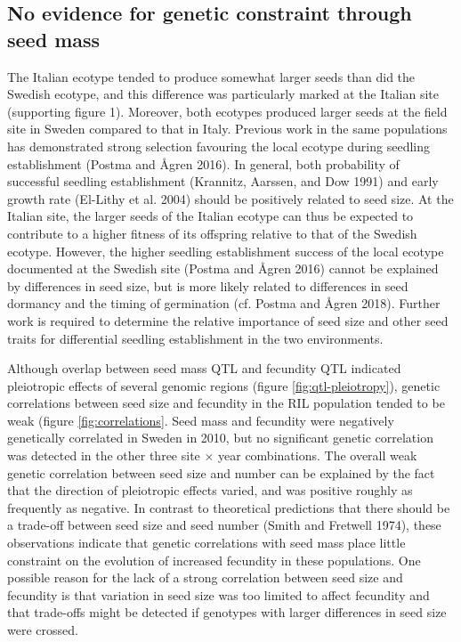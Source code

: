 \documentclass[]{article}
\begin{document}
\hypertarget{no-evidence-for-genetic-constraint-through-seed-mass}{%
\subsection{No evidence for genetic constraint through seed mass}\label{no-evidence-for-genetic-constraint-through-seed-mass}}

The Italian ecotype tended to produce somewhat larger seeds than did the Swedish ecotype, and this difference was particularly marked at the Italian site (supporting figure 1). Moreover, both ecotypes produced larger seeds at the field site in Sweden compared to that in Italy. Previous work in the same populations has demonstrated strong selection favouring the local ecotype during seedling establishment (Postma and Ågren 2016). In general, both probability of successful seedling establishment (Krannitz, Aarssen, and Dow 1991) and early growth rate (El-Lithy et al. 2004) should be positively related to seed size.
At the Italian site, the larger seeds of the Italian ecotype can thus be expected to contribute to a higher fitness of its offspring relative to that of the Swedish ecotype. However, the higher seedling establishment success of the local ecotype documented at the Swedish site (Postma and Ågren 2016) cannot be explained by differences in seed size, but is more likely related to differences in seed dormancy and the timing of germination (cf. Postma and Ågren 2018). Further work is required to determine the relative importance of seed size and other seed traits for differential seedling establishment in the two environments.

Although overlap between seed mass QTL and fecundity QTL indicated pleiotropic effects of several genomic regions (figure \ref{fig:qtl-pleiotropy}), genetic correlations between seed size and fecundity in the RIL population tended to be weak (figure \ref{fig:correlations}. Seed mass and fecundity were negatively genetically correlated in Sweden in 2010, but no significant genetic correlation was detected in the other three site × year combinations. The overall weak genetic correlation between seed size and number can be explained by the fact that the direction of pleiotropic effects varied, and was positive roughly as frequently as negative. In contrast to theoretical predictions that there should be a trade-off between seed size and seed number (Smith and Fretwell 1974), these observations indicate that genetic correlations with seed mass place little constraint on the evolution of increased fecundity in these populations. One possible reason for the lack of a strong correlation between seed size and fecundity is that variation in seed size was too limited to affect fecundity and that trade-offs might be detected if genotypes with larger differences in seed size were crossed.
\end{document}
